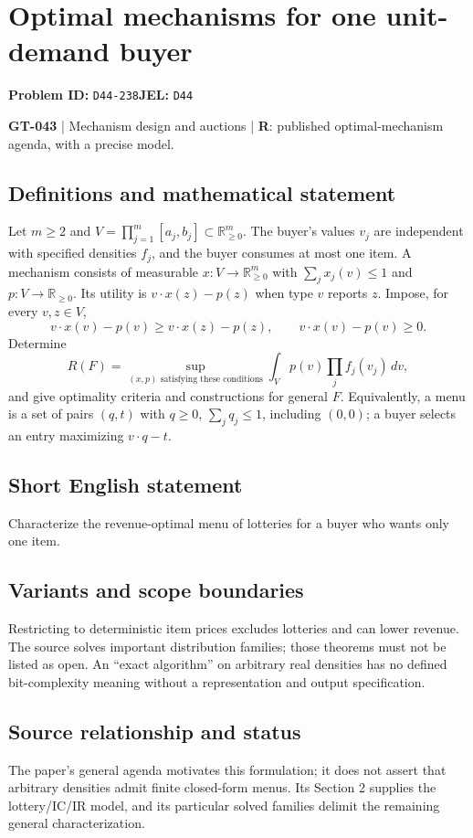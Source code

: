 \documentclass[11pt,a4paper]{article}
\begin{document}
\section*{Optimal mechanisms for one unit-demand buyer}
\textbf{Problem ID:} \texttt{D44-238}\quad \textbf{JEL:} \texttt{D44}\par
\label{problem:OP-0173}
\label{game:GT-043}
{\sffamily\small\color{muted}
\textbf{GT-043} | Mechanism design and auctions | \textbf{R}: published optimal-mechanism agenda, with a precise model.
\par}
\subsection*{Definitions and mathematical statement}
Let $m\geq2$ and $V=\prod_{j=1}^m[a_j,b_j]\subset\mathbb R_{\geq0}^m$. The buyer's values $v_j$ are independent with specified densities $f_j$, and the buyer consumes at most one item. A mechanism consists of measurable $x:V\to\mathbb R_{\geq0}^m$ with $\sum_jx_j(v)\leq1$ and $p:V\to\mathbb R_{\geq0}$. Its utility is $v\cdot x(z)-p(z)$ when type $v$ reports $z$. Impose, for every $v,z\in V$,
\[
 v\cdot x(v)-p(v)\geq v\cdot x(z)-p(z),\qquad v\cdot x(v)-p(v)\geq0.
\]
Determine
\[
 R(F)=\sup_{(x,p)\text{ satisfying these conditions}}\int_Vp(v)\prod_jf_j(v_j)\,dv,
\]
and give optimality criteria and constructions for general $F$. Equivalently, a menu is a set of pairs $(q,t)$ with $q\geq0$, $\sum_jq_j\leq1$, including $(0,0)$; a buyer selects an entry maximizing $v\cdot q-t$.
\subsection*{Short English statement}
Characterize the revenue-optimal menu of lotteries for a buyer who wants only one item.
\subsection*{Variants and scope boundaries}
Restricting to deterministic item prices excludes lotteries and can lower revenue. The source solves important distribution families; those theorems must not be listed as open. An ``exact algorithm'' on arbitrary real densities has no defined bit-complexity meaning without a representation and output specification.
\subsection*{Source relationship and status}
The paper's general agenda motivates this formulation; it does not assert that arbitrary densities admit finite closed-form menus. Its Section 2 supplies the lottery/IC/IR model, and its particular solved families delimit the remaining general characterization.
\end{document}
